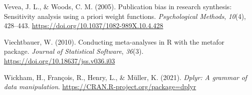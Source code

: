 \documentclass[
  bookmarksnumbered]{article}
\newlength{\cslhangindent}
\newlength{\cslentryspacingunit} %
\newenvironment{CSLReferences}[2] %
 {%
  \setlength{\parindent}{0pt}
  \ifodd #1
  \let\oldpar\par
  \def\par{\hangindent=\cslhangindent\oldpar}
  \fi
  \setlength{\parskip}{#2\cslentryspacingunit}
 }%
 {}
\begin{document}
\begin{CSLReferences}{1}{0}
\leavevmode{}%
Vevea, J. L., \& Woods, C. M. (2005). Publication bias in research synthesis: Sensitivity analysis using a priori weight functions. \emph{Psychological Methods}, \emph{10}(4), 428--443. \url{https://doi.org/10.1037/1082-989X.10.4.428}

\leavevmode{}%
Viechtbauer, W. (2010). Conducting meta-analyses in {R} with the metafor package. \emph{Journal of Statistical Software}, \emph{36}(3). \url{https://doi.org/10.18637/jss.v036.i03}

\leavevmode{}%
Wickham, H., François, R., Henry, L., \& Müller, K. (2021). \emph{Dplyr: A grammar of data manipulation}. \url{https://CRAN.R-project.org/package=dplyr}

\end{CSLReferences}
\end{document}
